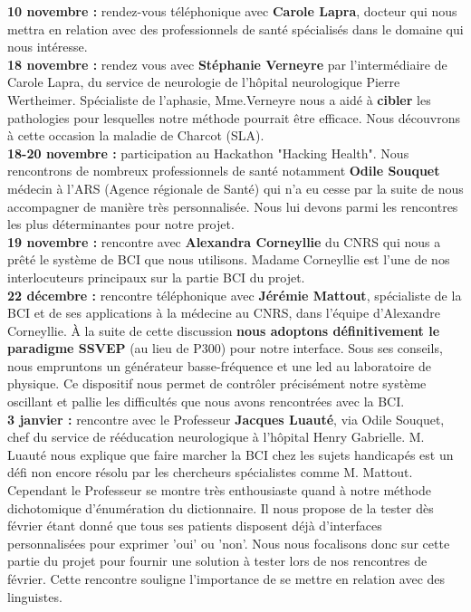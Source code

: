 \documentclass[11pt,a4paper]{article}
\theoremstyle{plain}
\theoremstyle{definition}
\begin{document}
\textbf{10 novembre : } rendez-vous téléphonique avec \textbf{Carole Lapra}, docteur qui nous mettra en relation avec des professionnels de santé spécialisés dans le domaine qui nous intéresse. \\

\textbf{18 novembre : } rendez vous avec \textbf{Stéphanie Verneyre} par l'intermédiaire de Carole Lapra, du service de neurologie de l'hôpital neurologique Pierre Wertheimer. Spécialiste de l'aphasie, Mme.Verneyre nous a aidé à \textbf{cibler} les pathologies pour lesquelles notre méthode pourrait être efficace. Nous découvrons à cette occasion la maladie de Charcot (SLA). \\

\textbf{18-20 novembre : } participation au Hackathon "Hacking Health". Nous rencontrons de nombreux professionnels de santé notamment \textbf{Odile Souquet} médecin à l'ARS (Agence régionale de Santé) qui n'a eu cesse par la suite de nous accompagner de manière très personnalisée. Nous lui devons parmi les rencontres les plus déterminantes pour notre projet. \\

\textbf{19 novembre : } rencontre avec \textbf{Alexandra Corneyllie} du CNRS qui nous a prêté le système de BCI que nous utilisons. Madame Corneyllie est l'une de nos interlocuteurs principaux sur la partie BCI du projet. \\

\textbf{22 décembre : } rencontre téléphonique avec \textbf{Jérémie Mattout}, spécialiste de la BCI et de ses applications à la médecine au CNRS, dans l'équipe d'Alexandre Corneyllie. À la suite de cette discussion \textbf{nous adoptons définitivement le paradigme SSVEP} (au lieu de P300) pour notre interface. Sous ses conseils, nous empruntons un générateur basse-fréquence et une led au laboratoire de physique. Ce dispositif nous permet de contrôler précisément notre système oscillant et pallie les difficultés que nous avons rencontrées avec la BCI. \\

\textbf{3 janvier : } rencontre avec le Professeur \textbf{Jacques Luauté}, via Odile Souquet, chef du service de rééducation neurologique à l'hôpital Henry Gabrielle. M. Luauté nous explique que faire marcher la BCI chez les sujets handicapés est un défi non encore résolu par les chercheurs spécialistes comme M. Mattout. Cependant le Professeur se montre très enthousiaste quand à notre méthode dichotomique d'énumération du dictionnaire. Il nous propose de la tester dès février étant donné que tous ses patients disposent déjà d'interfaces personnalisées pour exprimer 'oui' ou 'non'. Nous nous focalisons donc sur cette partie du projet pour fournir une solution à tester lors de nos rencontres de février. Cette rencontre souligne l'importance de se mettre en relation avec des linguistes. \\
\end{document}
